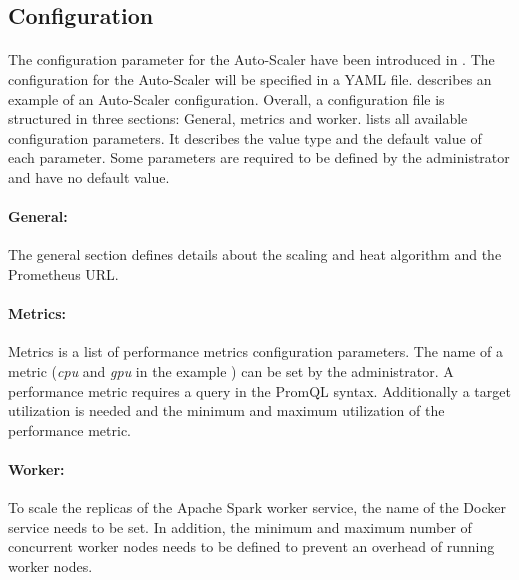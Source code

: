 %
%

\subsection{Configuration}
\paragraph{}The configuration parameter for the Auto-Scaler have been introduced in .
The configuration for the Auto-Scaler will be specified in a YAML file.
 describes an example of an Auto-Scaler configuration.
Overall, a configuration file is structured in three sections: General, metrics and worker.
 lists all available configuration parameters. It describes the value type and the default value of each parameter. Some parameters are required to be defined by the administrator and have no default value.

\paragraph{General:}
The general section defines details about the scaling and heat algorithm and the Prometheus URL.


\paragraph{Metrics:}
Metrics is a list of performance metrics configuration parameters. The name of a metric (\textit{cpu} and \textit{gpu} in the example ) can be set by the administrator. A performance metric requires a query in the PromQL syntax. Additionally a target utilization is needed and the minimum and maximum utilization of the performance metric.


\paragraph{Worker:}
To scale the replicas of the Apache Spark worker service, the name of the Docker service needs to be set. In addition, the minimum and maximum number of concurrent worker nodes needs to be defined to prevent an overhead of running worker nodes.


